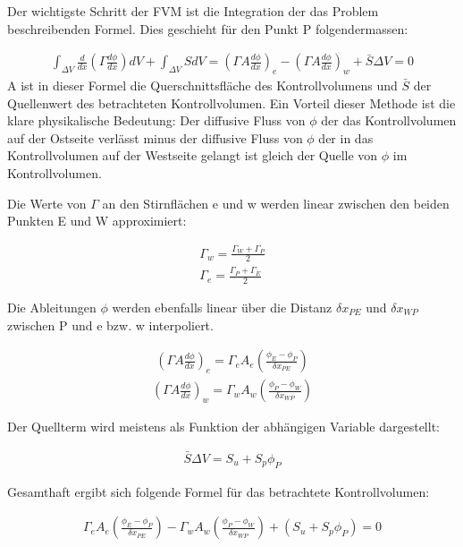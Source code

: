 \documentclass[a4paper]{scrartcl}
\begin{document}
Der wichtigste Schritt der FVM ist die Integration der das Problem
beschreibenden Formel. Dies geschieht für den Punkt P folgendermassen:

\begin{align}
\int_{\Delta V} \frac{d}{dx} \left( \Gamma \frac{d\phi}{dx}\right)dV +
\int_{\Delta V}SdV = \left(\Gamma A
\frac{d\phi}{dx}\right)_{e}-\left(\Gamma A \frac{d\phi}{dx}\right)_w +
\bar{S}\Delta V = 0
\end{align}
A ist in dieser Formel die Querschnittsfläche des Kontrollvolumens und $\bar{S}$
der Quellenwert des betrachteten Kontrollvolumen. Ein Vorteil dieser Methode ist
die klare physikalische Bedeutung: Der diffusive Fluss von $\phi$ der das
Kontrollvolumen auf der Ostseite verlässt minus der diffusive Fluss von $\phi$
der in das Kontrollvolumen auf der Westseite gelangt ist gleich der Quelle von
$\phi$ im Kontrollvolumen.

Die Werte von $\Gamma$ an den Stirnflächen e und w werden linear zwischen den
beiden Punkten E und W approximiert:

\begin{align}
\Gamma_w=\frac{\Gamma_W+\Gamma_P}{2} \\
\Gamma_e=\frac{\Gamma_P+\Gamma_E}{2}
\end{align}

Die Ableitungen $\phi$ werden ebenfalls linear über die Distanz $\delta x_{PE}$
und $\delta x_{WP}$ zwischen P und e bzw. w interpoliert.

\begin{align}
\left(\Gamma A \frac{d\phi}{dx}\right)_e = \Gamma_e A_e
\left(\frac{\phi_E - \phi_P}{\delta x_{PE}}\right)
\end{align}
\begin{align}
\left(\Gamma A \frac{d\phi}{dx}\right)_w = \Gamma_w A_w
\left(\frac{\phi_P - \phi_W}{\delta x_{WP}}\right)
\end{align}

Der Quellterm wird meistens als Funktion der abhängigen Variable dargestellt:

\begin{align}
\bar{S}\Delta V = S_u+S_p\phi_P
\end{align}


Gesamthaft ergibt sich folgende Formel für das betrachtete Kontrollvolumen:

\begin{align}
\Gamma_e A_e \left(\frac{\phi_E-\phi_P}{\delta x_{PE}}\right)-\Gamma_w A_w
\left(\frac{\phi_P-\phi_W}{\delta x_{WP}}\right)+(S_u+S_p\phi_P)=0
\end{align}
\end{document}
